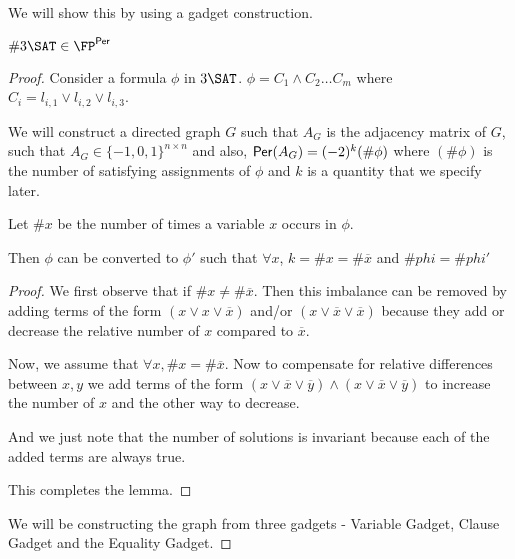 We will show this by using a gadget construction.

\begin{theorem}
$\#3\SAT\in \FP^{\per}$
\end{theorem}
\begin{proof}
Consider a formula $\phi $ in $3\SAT$. $\phi = C_1\wedge C_2 \dots C_m$ where $C_i = l_{i,1}\vee l_{i,2} \vee l_{i,3}$.

We will construct a directed graph $G$ such that $A_G$ is the adjacency matrix of $G$, such that $A_G \in \{-1,0,1\}^{n\times n}$ and also, ${\sf Per}(A_G)=(-2)^k(\#\phi)$ where $(\#\phi)$ is the number of satisfying assignments of $\phi$ and $k$ is a quantity that we specify later.

\begin{lemma}
Let $\#x$ be the number of times a variable $x$ occurs in $\phi$. 

Then $\phi$ can be converted to $\phi'$ such that $\forall x$, $k = \#x=\# \overline{x}$ and $\#phi = \# phi'$
\end{lemma}

\begin{proof}
 We first observe that if $\# x \not = \# \overline{x}$. Then this imbalance can be removed by adding terms of the form $(x\vee x\vee \overline{x})$ and/or $(x\vee \overline{x}\vee \overline{x})$ because they add or decrease the relative number of $x$ compared to $\overline{x}$.
 
 Now, we assume that $\forall x, \#x = \# \overline{x}$.
 Now to compensate for relative differences between $x, y$ we add terms of the form $(x\vee \overline{x}\vee \overline{y})\wedge (x\vee \overline{x}\vee \overline{y})$ to increase the number of $x$ and the other way to decrease.
 
 And we just note that the number of solutions is invariant because each of the added terms are always true.
 
 This completes the lemma.
 \end{proof}
  
  We will be constructing the graph from three gadgets - Variable Gadget, Clause Gadget and the Equality Gadget.


\end{proof}
